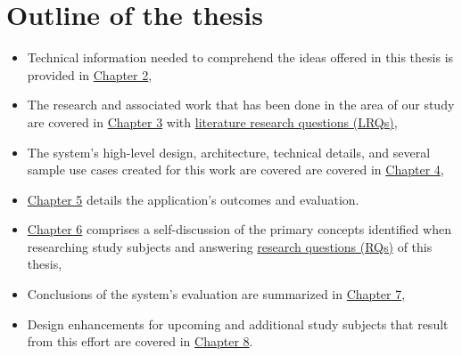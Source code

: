 \section{Outline of the thesis}
\begin{itemize}


    \item Technical information needed to comprehend the ideas offered in this thesis is provided in \hyperref[sec:background]{Chapter 2},

\vspace{.5cm}

    \item The research and associated work that has been done in the area of our study are covered in \hyperref[sec:related]{Chapter 3} with \hyperref[LRQ1.]{literature research questions (LRQs)},
    
\vspace{.5cm}

    \item The system's high-level design, architecture, technical details, and several sample use cases created for this work are covered  are covered in \hyperref[sec:methods]{Chapter 4},
    
\vspace{.5cm}

    \item \hyperref[sec:results]{Chapter 5} details the application's outcomes and evaluation.
    
\vspace{.5cm}

    \item \hyperref[sec:discussion]{Chapter 6} comprises a self-discussion of the primary concepts identified when researching study subjects and answering \hyperref[RQ1.]{research questions (RQs)} of this thesis,

\vspace{.5cm}

    \item Conclusions of the system's evaluation are summarized in \hyperref[sec:conclusion]{Chapter 7},

\vspace{.5cm}
  
    \item Design enhancements for upcoming and additional study subjects that result from this effort are covered in \hyperref[sec:futurework]{Chapter 8}.
\end{itemize}


